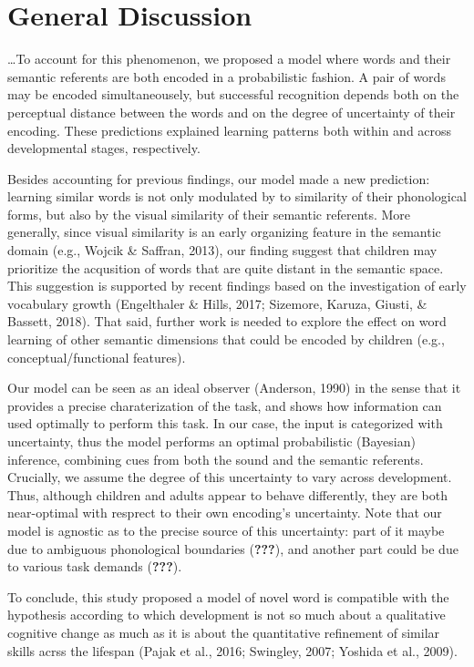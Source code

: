 \documentclass[10pt, letterpaper]{article}
\begin{document}
\section{General Discussion}\label{general-discussion}

\ldots{}To account for this phenomenon, we proposed a model where words
and their semantic referents are both encoded in a probabilistic
fashion. A pair of words may be encoded simultaneousely, but successful
recognition depends both on the perceptual distance between the words
and on the degree of uncertainty of their encoding. These predictions
explained learning patterns both within and across developmental stages,
respectively.

Besides accounting for previous findings, our model made a new
prediction: learning similar words is not only modulated by to
similarity of their phonological forms, but also by the visual
similarity of their semantic referents. More generally, since visual
similarity is an early organizing feature in the semantic domain (e.g.,
Wojcik \& Saffran, 2013), our finding suggest that children may
prioritize the acqusition of words that are quite distant in the
semantic space. This suggestion is supported by recent findings based on
the investigation of early vocabulary growth (Engelthaler \& Hills,
2017; Sizemore, Karuza, Giusti, \& Bassett, 2018). That said, further
work is needed to explore the effect on word learning of other semantic
dimensions that could be encoded by children (e.g.,
conceptual/functional features).

Our model can be seen as an ideal observer (Anderson, 1990) in the sense
that it provides a precise charaterization of the task, and shows how
information can used optimally to perform this task. In our case, the
input is categorized with uncertainty, thus the model performs an
optimal probabilistic (Bayesian) inference, combining cues from both the
sound and the semantic referents. Crucially, we assume the degree of
this uncertainty to vary across development. Thus, although children and
adults appear to behave differently, they are both near-optimal with
resprect to their own encoding's uncertainty. Note that our model is
agnostic as to the precise source of this uncertainty: part of it maybe
due to ambiguous phonological boundaries ({\textbf{???}}), and another
part could be due to various task demands ({\textbf{???}}).

To conclude, this study proposed a model of novel word is compatible
with the hypothesis according to which development is not so much about
a qualitative cognitive change as much as it is about the quantitative
refinement of similar skills acrss the lifespan (Pajak et al., 2016;
Swingley, 2007; Yoshida et al., 2009).
\end{document}
